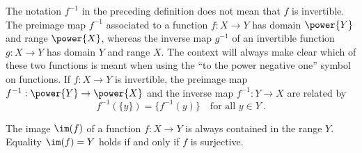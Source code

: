 \begin{remarks} 
\begin{letterlist}
  \item 
  The notation $f^{-1}$ in the preceding definition does not mean that $f$ 
  is invertible. The preimage map $f^{-1}$ associated to a function 
  $f : X \to Y$ has domain $\power{Y}$ and range $\power{X}$, 
  whereas the inverse map $g^{-1}$ of an invertible function 
  $g: X \to Y$ has domain $Y$ and range $X$. The context will always make 
  clear which of these two functions is meant when using the 
  ``to the power negative one'' symbol on functions. 
  If $f : X \to Y$ is invertible, the preimage map 
  $f^{-1} : \power{Y} \to \power{X}$ and the inverse map 
  $f^{-1} : Y \to X$ are related by 
  \[
    f^{-1} (\{y\}) = \big\{ f^{-1} (y) \big\} \quad \text{for all } y \in Y \ .
  \] 
  \item
  The image $\im (f)$ of a function $f:X \to Y$ is always contained in the 
  range $Y$. Equality $\im (f) = Y$ holds if and only if $f$ is surjective.
\end{letterlist}
\end{remarks}


